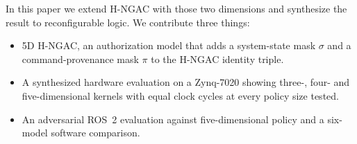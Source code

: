 \documentclass[conference]{IEEEtran}
\newcommand{\new}[1]{\textcolor{hkred}{#1}}
\begin{document}
In this paper we extend H-NGAC with those two dimensions and synthesize the result to reconfigurable logic. We contribute three things:
\begin{itemize}
    \item 5D H-NGAC, an authorization model that adds a system-state mask $\sigma$ and a command-provenance mask $\pi$ to the H-NGAC identity triple. %
    \item A synthesized hardware evaluation on a Zynq-7020 showing three-, four- and five-dimensional kernels with equal clock cycles at every policy size tested. %
    \item An adversarial ROS~2 evaluation against five-dimensional policy and a six-model software comparison.
\end{itemize}
\end{document}
